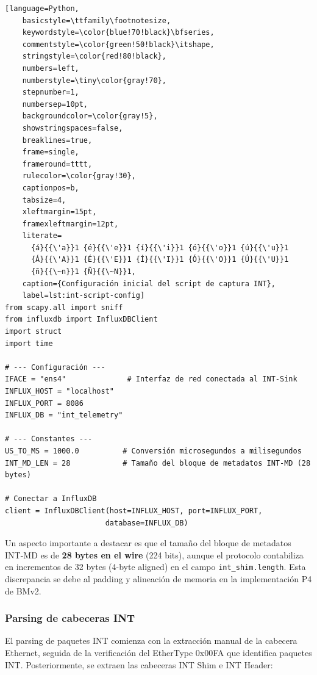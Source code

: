 \begin{lstlisting}[language=Python,
    basicstyle=\ttfamily\footnotesize,
    keywordstyle=\color{blue!70!black}\bfseries,
    commentstyle=\color{green!50!black}\itshape,
    stringstyle=\color{red!80!black},
    numbers=left,
    numberstyle=\tiny\color{gray!70},
    stepnumber=1,
    numbersep=10pt,
    backgroundcolor=\color{gray!5},
    showstringspaces=false,
    breaklines=true,
    frame=single,
    frameround=tttt,
    rulecolor=\color{gray!30},
    captionpos=b,
    tabsize=4,
    xleftmargin=15pt,
    framexleftmargin=12pt,
    literate=
      {á}{{\'a}}1 {é}{{\'e}}1 {í}{{\'i}}1 {ó}{{\'o}}1 {ú}{{\'u}}1
      {Á}{{\'A}}1 {É}{{\'E}}1 {Í}{{\'I}}1 {Ó}{{\'O}}1 {Ú}{{\'U}}1
      {ñ}{{\~n}}1 {Ñ}{{\~N}}1,
    caption={Configuración inicial del script de captura INT}, 
    label=lst:int-script-config]
from scapy.all import sniff
from influxdb import InfluxDBClient
import struct
import time

# --- Configuración ---
IFACE = "ens4"              # Interfaz de red conectada al INT-Sink
INFLUX_HOST = "localhost"
INFLUX_PORT = 8086
INFLUX_DB = "int_telemetry"

# --- Constantes ---
US_TO_MS = 1000.0          # Conversión microsegundos a milisegundos
INT_MD_LEN = 28            # Tamaño del bloque de metadatos INT-MD (28 bytes)

# Conectar a InfluxDB
client = InfluxDBClient(host=INFLUX_HOST, port=INFLUX_PORT, 
                       database=INFLUX_DB)
\end{lstlisting}

Un aspecto importante a destacar es que el tamaño del bloque de metadatos INT-MD es de \textbf{28 bytes en el wire} (224 bits), aunque el protocolo contabiliza en incrementos de 32 bytes (4-byte aligned) en el campo \texttt{int\_shim.length}. Esta discrepancia se debe al padding y alineación de memoria en la implementación P4 de BMv2.

\subsubsection{Parsing de cabeceras INT}
El parsing de paquetes INT comienza con la extracción manual de la cabecera Ethernet, seguida de la verificación del EtherType 0x00FA que identifica paquetes INT. Posteriormente, se extraen las cabeceras INT Shim e INT Header:

